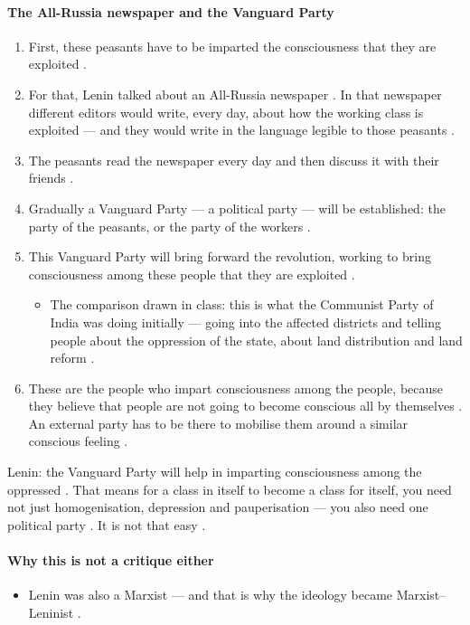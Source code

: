 \paragraph{The All-Russia newspaper and the Vanguard Party}
\begin{enumerate}
    \item First, these peasants have to be imparted the consciousness that they are exploited .
    \item For that, Lenin talked about an All-Russia newspaper . In that newspaper different editors would write, every day, about how the working class is exploited --- and they would write in the language legible to those peasants .
    \item The peasants read the newspaper every day and then discuss it with their friends .
    \item Gradually a Vanguard Party --- a political party --- will be established: the party of the peasants, or the party of the workers .
    \item This Vanguard Party will bring forward the revolution, working to bring consciousness among these people that they are exploited .
    \begin{itemize}
        \item The comparison drawn in class: this is what the Communist Party of India was doing initially --- going into the affected districts and telling people about the oppression of the state, about land distribution and land reform .
    \end{itemize}
    \item These are the people who impart consciousness among the people, because they believe that people are not going to become conscious all by themselves . An external party has to be there to mobilise them around a similar conscious feeling .
\end{enumerate}

\begin{KeyConcept}
Lenin: the Vanguard Party will help in imparting consciousness among the oppressed . That means for a class in itself to become a class for itself, you need not just homogenisation, depression and pauperisation --- you also need one political party . It is not that easy .
\end{KeyConcept}

\paragraph{Why this is not a critique either}
\begin{itemize}
    \item Lenin was also a Marxist --- and that is why the ideology became Marxist--Leninist .
\end{itemize}

